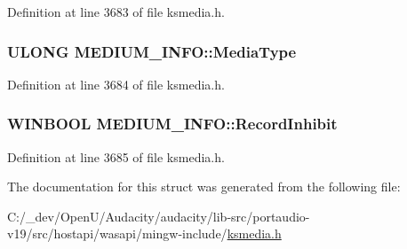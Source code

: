 Definition at line 3683 of file ksmedia.\+h.

\subsubsection[{\texorpdfstring{Media\+Type}{MediaType}}]{\setlength{\rightskip}{0pt plus 5cm}U\+L\+O\+NG M\+E\+D\+I\+U\+M\+\_\+\+I\+N\+F\+O\+::\+Media\+Type}\hypertarget{struct_m_e_d_i_u_m___i_n_f_o_aff94b9e8478b21af9c183b06070adab2}{}\label{struct_m_e_d_i_u_m___i_n_f_o_aff94b9e8478b21af9c183b06070adab2}


Definition at line 3684 of file ksmedia.\+h.

\subsubsection[{\texorpdfstring{Record\+Inhibit}{RecordInhibit}}]{\setlength{\rightskip}{0pt plus 5cm}W\+I\+N\+B\+O\+OL M\+E\+D\+I\+U\+M\+\_\+\+I\+N\+F\+O\+::\+Record\+Inhibit}\hypertarget{struct_m_e_d_i_u_m___i_n_f_o_a08b9135c7819f1b2bf10d92713c5c534}{}\label{struct_m_e_d_i_u_m___i_n_f_o_a08b9135c7819f1b2bf10d92713c5c534}


Definition at line 3685 of file ksmedia.\+h.



The documentation for this struct was generated from the following file\+:\begin{DoxyCompactItemize}
\item 
C\+:/\+\_\+dev/\+Open\+U/\+Audacity/audacity/lib-\/src/portaudio-\/v19/src/hostapi/wasapi/mingw-\/include/\hyperlink{ksmedia_8h}{ksmedia.\+h}\end{DoxyCompactItemize}
